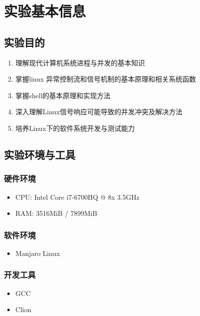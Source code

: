 \section{实验基本信息}

\subsection{实验目的}
\begin{enumerate}
    \item 理解现代计算机系统进程与并发的基本知识
    \item 掌握linux 异常控制流和信号机制的基本原理和相关系统函数
    \item 掌握shell的基本原理和实现方法
    \item 深入理解Linux信号响应可能导致的并发冲突及解决方法
    \item 培养Linux下的软件系统开发与测试能力
\end{enumerate}

\subsection{实验环境与工具}

\subsubsection{硬件环境}
\begin{itemize}
    \item CPU: Intel Core i7-6700HQ @ 8x 3.5GHz
    \item RAM: 3516MiB / 7899MiB
\end{itemize}

\subsubsection{软件环境}
\begin{itemize}
    \item Manjaro Linux

\end{itemize}

\subsubsection{开发工具}
\begin{itemize}
    \item GCC
    \item Clion
\end{itemize}